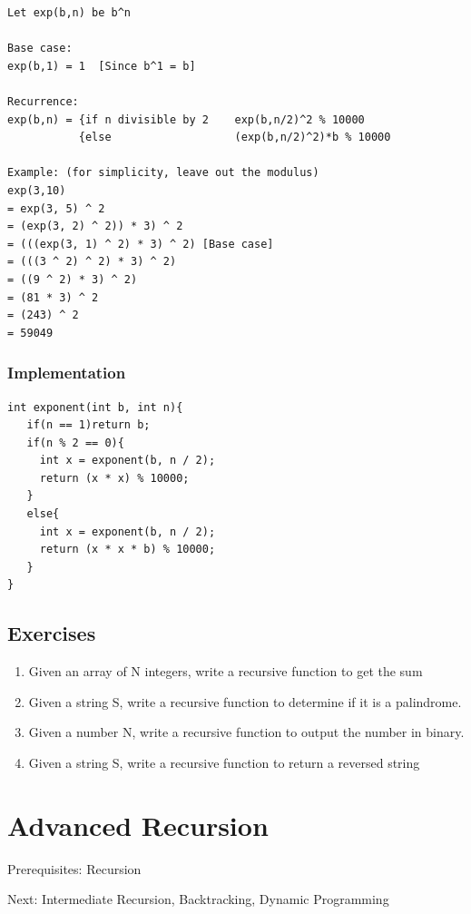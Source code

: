 \documentclass[11pt,oneside]{book}
\begin{document}
\begin{lstlisting}
Let exp(b,n) be b^n

Base case:
exp(b,1) = 1  [Since b^1 = b]

Recurrence:
exp(b,n) = {if n divisible by 2    exp(b,n/2)^2 % 10000
           {else                   (exp(b,n/2)^2)*b % 10000

Example: (for simplicity, leave out the modulus)
exp(3,10)
= exp(3, 5) ^ 2
= (exp(3, 2) ^ 2)) * 3) ^ 2
= (((exp(3, 1) ^ 2) * 3) ^ 2) [Base case]
= (((3 ^ 2) ^ 2) * 3) ^ 2)
= ((9 ^ 2) * 3) ^ 2)
= (81 * 3) ^ 2
= (243) ^ 2
= 59049
\end{lstlisting}

\subsubsection{Implementation}

\begin{lstlisting}
int exponent(int b, int n){
   if(n == 1)return b;
   if(n % 2 == 0){
     int x = exponent(b, n / 2);
     return (x * x) % 10000;
   }
   else{
     int x = exponent(b, n / 2);
     return (x * x * b) % 10000;
   }
}

\end{lstlisting}

\subsection{Exercises}

\begin{enumerate}
\item Given an array of N integers, write a recursive function to get the sum
\item Given a string S, write a recursive function to determine if it is a palindrome.
\item Given a number N, write a recursive function to output the number in binary.
\item Given a string S, write a recursive function to return a reversed string
\end{enumerate}

        \section{ Advanced Recursion }
        

Prerequisites: Recursion

Next: Intermediate Recursion, Backtracking, Dynamic Programming
\end{document}
